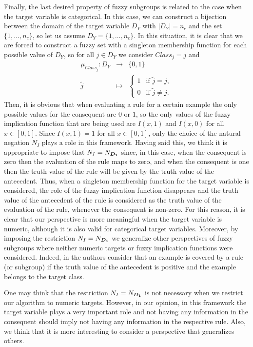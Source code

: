 Finally, the last desired property of fuzzy subgroups is related to the case when the target variable is categorical. In this case, we can construct a bijection between the domain of the target variable $D_Y$ with $|D_Y|=n_c$ and the set $\{1,\dots,n_c\}$, so let us assume $D_Y=\{1,\dots,n_c\}$. In this situation, it is clear that we are forced to construct a fuzzy set with a singleton membership function for each possible value of $D_Y$, so for all $j \in D_Y$ we consider $Class_j=j$ and
$$   
\begin{array}{rcl}
	\mu_{Class_j}:D_Y&\longrightarrow&\{0,1\}\\
	\tilde{j}&\longmapsto& \left\{ \begin{array}{ll}
		1 &   \text{if }   \tilde{j}=j, \\
		0 &   \text{if }   \tilde{j}\not = j.
	\end{array}
	\right.
\end{array}
$$
Then, it is obvious that when evaluating a rule for a certain example the only possible values for the consequent are $0$ or $1$, so the only values of the fuzzy implication function that are being used are $I(x,1)$ and $I(x,0)$ for all $x \in [0,1]$. Since $I(x,1)=1$ for all $x \in [0,1]$, only the choice of the natural negation $N_I$ plays a role in this framework. Having said this, we think it is appropriate to impose that $N_I=N_{\bm{D_1}}$ since, in this case, when the consequent is zero then the evaluation of the rule maps to zero, and when the consequent is one then the truth value of the rule will be given by the truth value of the antecedent. Thus, when a singleton membership function for the target variable is considered, the role of the fuzzy implication function disappears and the truth value of the antecedent of the rule is considered as the truth value of the evaluation of the rule, whenever the consequent is non-zero. For this reason, it is clear that our perspective is more meaningful when the target variable is numeric, although it is also valid for categorical target variables. Moreover, by imposing the restriction $N_I=N_{\bm{D_1}}$ we generalize other perspectives of fuzzy subgroups where neither numeric targets or fuzzy implication functions were considered. Indeed, in \cite{delJesus2007} the authors consider that an example is covered by a rule (or subgroup) if the truth value of the antecedent is positive and the example belongs to the target class.

\begin{remark}
	One may think that the restriction $N_I=N_{\bm{D_1}}$ is not necessary when we restrict our algorithm to numeric targets. However, in our opinion, in this framework the target variable plays a very important role and not having any information in the consequent should imply not having any information in the respective rule. Also, we think that it is more interesting to consider a perspective that generalizes others.
\end{remark}

